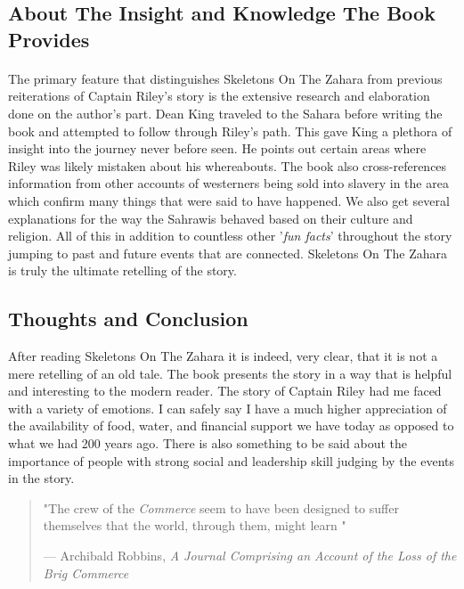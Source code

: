 \subsection*{About The Insight and Knowledge The Book Provides} \paragraph*{}
The primary feature that distinguishes Skeletons On The Zahara from previous reiterations of Captain Riley's story is the extensive research and elaboration done on the author's part. Dean King traveled to the Sahara before writing the book and attempted to follow through Riley's path. This gave King a plethora of insight into the journey never before seen. He points out certain areas where Riley was likely mistaken about his whereabouts. The book also cross-references information from other accounts of westerners being sold into slavery in the area which confirm many things that were said to have happened. We also get several explanations for the way the Sahrawis behaved based on their culture and religion. All of this in addition to countless other '\textit{fun facts}' throughout the story jumping to past and future events that are connected.  Skeletons On The Zahara is truly the ultimate retelling of the story. 

\subsection*{Thoughts and Conclusion}

After reading Skeletons On The Zahara it is indeed, very clear, that it is not a mere retelling of an old tale. The book presents the story in a way that is helpful and interesting to the modern reader. The story of Captain Riley had me faced with a variety of emotions. I can safely say I have a much higher appreciation of the availability of food, water, and financial support we have today as opposed to what we had 200 years ago. There is also something to be said about the importance of people with strong social and leadership skill judging by the events in the story. \newline

\begin{quote}
"The crew of the \textit{Commerce} seem to have been designed to suffer themselves that the world, through them, might learn "\newline \begin{center}
--- Archibald Robbins, \textit{A Journal Comprising an Account of the Loss of the Brig Commerce}
\end{center}

\end{quote}



